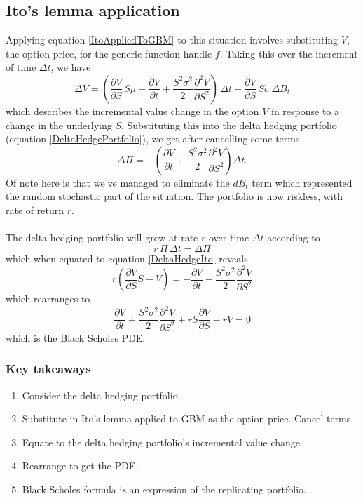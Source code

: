 \documentclass[12pt]{article}
\newcommand{\dpart}[2]{\frac{\partial #1}{\partial #2}}
\begin{document}
\subsection{Ito's lemma application}

Applying equation \ref{ItoAppliedToGBM} to this situation involves substituting $V$, the option price, for the generic function handle $f$. Taking this over the increment of time $\Delta t$, we have
\begin{equation}
	\Delta V=\left(\dpart{V}{S}\,S\mu+\dpart{V}{t}+\frac{S^2\sigma^2}{2}\frac{\partial^2 V}{\partial S^2}\right)\,\Delta t + \dpart{V}{S}\,S\sigma\,\Delta B_t
\end{equation}
which describes the incremental value change in the option $V$ in response to a change in the underlying $S$. Substituting this into the delta hedging portfolio (equation \ref{DeltaHedgePortfolio}), we get after cancelling some terms
\begin{equation}\label{DeltaHedgeIto}
	\Delta\Pi = -\left(\dpart{V}{t}+\frac{S^2\sigma^2}{2}\frac{\partial^2 V}{\partial S^2}\right)\Delta t.
\end{equation}
Of note here is that we've managed to eliminate the $dB_t$ term which represented the random stochastic part of the situation. The portfolio is now riskless, with rate of return $r$.\\
\\
The delta hedging portfolio will grow at rate $r$ over time $\Delta t$ according to
\begin{equation}
	r\,\Pi\,\Delta t = \Delta \Pi
\end{equation}
which when equated to equation \ref{DeltaHedgeIto} reveals
\begin{equation}
	r\left(\dpart{V}{S}S-V\right)=-\dpart{V}{t}-\frac{S^2\sigma^2}{2}\frac{\partial^2 V}{\partial S^2}
\end{equation}
which rearranges to
\begin{equation}
	\dpart{V}{t}+\frac{S^2\sigma^2}{2}\frac{\partial^2 V}{\partial S^2}+rS\dpart{V}{S}-rV=0
\end{equation}
which is the Black Scholes PDE.
\subsubsection{Key takeaways}
\begin{enumerate}
	\item Consider the delta hedging portfolio.
	\item Substitute in Ito's lemma applied to GBM as the option price. Cancel terms.
	\item Equate to the delta hedging portfolio's incremental value change.
	\item Rearrange to get the PDE.
	\item Black Scholes formula is an expression of the replicating portfolio.
\end{enumerate}
\end{document}
